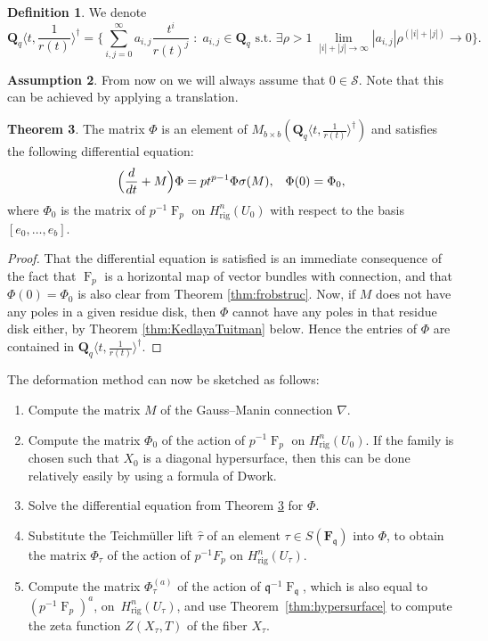 \documentclass[a4paper,11pt]{article}
\numberwithin{equation}{section}
\newcommand{\QQ}{\mathbf{Q}} %
\newcommand{\FF}{\mathbf{F}} %
\DeclareMathOperator{\Frob}{F}           %
\providecommand{\Hrig}{H_{\text{rig}}}  %
\theoremstyle{definition}
\newtheorem{thm}{Theorem}[section]
\newtheorem{defn}[thm]{Definition}
\newtheorem{assump}[thm]{Assumption}
\begin{document}
\begin{defn} We denote
\[
\QQ_q \langle t, \frac{1}{r(t)} \rangle^{\dag} = 
\biggl\{\sum_{i,j=0}^{\infty} a_{i,j} \frac{t^i}{r(t)^j} \; : \; 
a_{i,j} \in \QQ_q \text{ s.t. } \exists \rho > 1 \; 
\lim_{|i|+|j| \rightarrow \infty} |a_{i,j}| \rho^{(|i|+|j|)} \rightarrow 0 
\biggr\}.
\] 
\end{defn}

\begin{assump}
From now on we will always assume that $0 \in \mathcal{S}$. 
Note that this can be achieved by applying a translation.
\end{assump}

\begin{thm} \label{thm:eqphi} The matrix $\Phi$ is an element of $M_{b \times b}(\QQ_q \langle t, \frac{1}{r(t)} \rangle^{\dag})$ 
and satisfies the following differential equation:
\begin{equation*}
\Bigl(\frac{d}{dt} + M\Bigr) \Phi = p t^{p-1} \Phi \sigma(M), \; \; \; \Phi(0)=\Phi_0,
\end{equation*}
where $\Phi_0$ is the matrix of $p^{-1}\Frob_p$ on $\Hrig^n(U_0)$ with respect to the basis
$[e_0,\ldots,e_b]$.
\end{thm}

\begin{proof}
That the differential equation is satisfied is an immediate consequence of the fact that $\Frob_p$ is a
horizontal map of vector bundles with connection, and that $\Phi(0)=\Phi_0$ is also clear from Theorem
\ref{thm:frobstruc}. Now, if $M$ does not have any poles in a given residue disk, then $\Phi$ cannot have 
any poles in that residue disk either, by Theorem \ref{thm:KedlayaTuitman} below. Hence the entries 
of $\Phi$ are contained in $\QQ_q \langle t, \frac{1}{r(t)} \rangle^{\dag}$.
\end{proof}

The deformation method can now be sketched as follows:
\begin{enumerate}
\item Compute the matrix $M$ of the Gauss--Manin connection $\nabla$.
\item Compute the matrix $\Phi_0$ of the action of $p^{-1}\Frob_p$ on $\Hrig^n(U_0)$. If the
family is chosen such that $X_0$ is a diagonal hypersurface, then this can be done relatively
easily by using a formula of Dwork.
\item Solve the differential equation from Theorem \ref{thm:eqphi} for $\Phi$.
\item Substitute the Teichm\"uller lift $\hat{\tau}$ of an element $\tau \in S(\FF_{\mathfrak{q}})$
into $\Phi$,
to obtain the matrix $\Phi_{\tau}$ of the action of $p^{-1}F_p$ on $\Hrig^n(U_{\tau})$.
\item Compute the matrix $\Phi_{\tau}^{(a)}$ of the action of 
$\mathfrak{q}^{-1} \Frob_{\mathfrak{q}}$, which is also equal 
to $(p^{-1}\Frob_p)^a$, on~$\Hrig^n(U_{\tau})$, and use 
Theorem~\ref{thm:hypersurface} to compute the zeta function $Z(X_{\tau},T)$ 
of the fiber $X_{\tau}$.
\end{enumerate}
\end{document}
